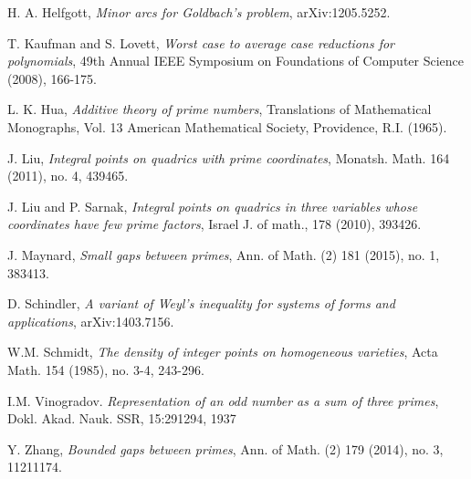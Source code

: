 \documentclass[12pt]{amsart}
\theoremstyle{definition}
\theoremstyle{remark}
\numberwithin{equation}{section}
\begin{document}
\begin{thebibliography}{9}
 H. A. Helfgott, \textit{Minor arcs for Goldbach's problem}, arXiv:1205.5252.

 T. Kaufman and S. Lovett, \textit{Worst case to average case reductions for polynomials}, 49th Annual IEEE Symposium on Foundations of Computer Science (2008), 166-175.

  L. K. Hua,  \textit{ Additive theory of prime numbers}, Translations of Mathematical Monographs, Vol. 13 American Mathematical Society,
Providence, R.I. (1965).

 J. Liu, \textit{Integral points on quadrics with prime coordinates},
Monatsh. Math. 164 (2011), no. 4, 439465.

  J. Liu and P. Sarnak, \textit{Integral points on quadrics in three variables whose coordinates have few prime factors}, Israel J. of math., 178 (2010), 393426.

  J. Maynard, \textit{Small gaps between primes}, Ann. of Math. (2) 181 (2015), no. 1, 383413.

 D. Schindler, \textit{A variant of Weyl's inequality for systems of forms and applications},	arXiv:1403.7156.

 W.M. Schmidt, \textit{The density of integer points on homogeneous varieties},
Acta Math. {154} (1985), no. 3-4, 243-296.

 I.M. Vinogradov. \textit{Representation of an odd number as
a sum of three primes}, Dokl. Akad. Nauk. SSR, 15:291294, 1937

  Y. Zhang, \textit{Bounded gaps between primes}, Ann. of Math. (2) 179 (2014), no. 3, 11211174.

\end{thebibliography}
\end{document}
